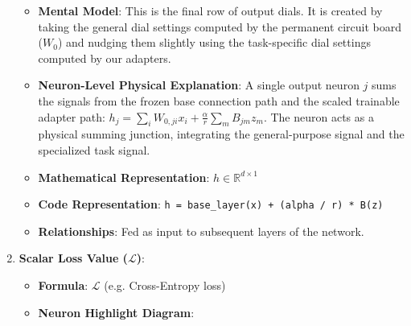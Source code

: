 \documentclass{article}
\begin{document}
\begin{enumerate}
\begin{itemize}
      \item \textbf{Mental Model}: This is the final row of output dials. It is created by taking the general dial settings computed by the permanent circuit board ($W_0$) and nudging them slightly using the task-specific dial settings computed by our adapters.
      \item \textbf{Neuron-Level Physical Explanation}: A single output neuron $j$ sums the signals from the frozen base connection path and the scaled trainable adapter path: $h_j = \sum_i W_{0, ji} x_i + \frac{\alpha}{r} \sum_m B_{jm} z_m$. The neuron acts as a physical summing junction, integrating the general-purpose signal and the specialized task signal.
      \item \textbf{Mathematical Representation}: $h \in \mathbb{R}^{d \times 1}$
      \item \textbf{Code Representation}: \texttt{h = base\_layer(x) + (alpha / r) * B(z)}
      \item \textbf{Relationships}: Fed as input to subsequent layers of the network.
    \end{itemize}

  \item \textbf{Scalar Loss Value ($\mathcal{L}$)}:
    \begin{itemize}
      \item \textbf{Formula}: $\mathcal{L}$ (e.g. Cross-Entropy loss)
      \item \textbf{Neuron Highlight Diagram}:

\begin{center}
\begin{adjustbox}{max width=0.85\linewidth}
\end{adjustbox}
\end{center}
\end{itemize}
\end{enumerate}
\end{document}
